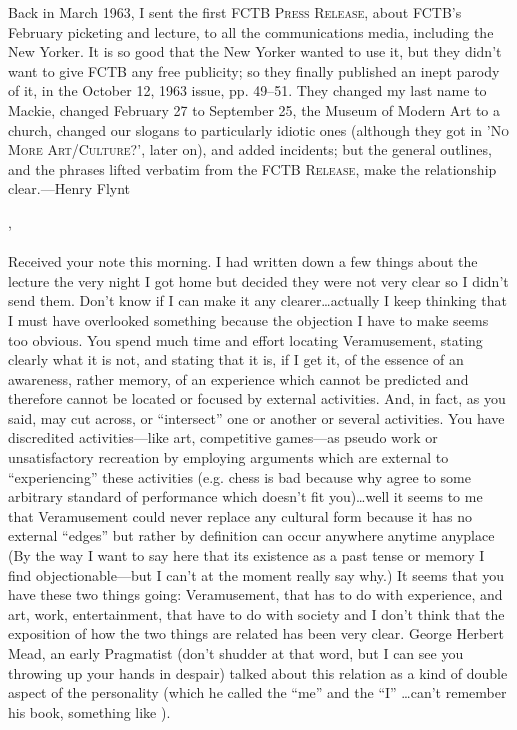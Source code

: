 \vfill


Back in March 1963, I sent the first \textsc{FCTB Press Release}, about FCTB's February picketing and lecture, to all the communications media, including the New Yorker. It is so good that the New Yorker wanted to use it, but they didn't want to give FCTB any free publicity; so they finally published an inept parody of it, in the October 12, 1963 issue, pp. 49--51. They changed my last name to Mackie, changed February 27 to September 25, the Museum of Modern Art to a church, changed our slogans to particularly idiotic ones (although they got in '\textsc{No More Art/Culture?}', later on), and added incidents; but the general outlines, and the phrases lifted verbatim from the \textsc{FCTB Release}, make the relationship clear.---Henry Flynt 

\clearpage



\vfill 

\noindentHenry, \\\\Received your note this morning. I had written down a few things about the lecture the very night I got home but decided they were not very clear so I didn't send them. Don't know if I can make it any clearer\ldots actually I keep thinking that I must have overlooked something because the objection I have to make seems too obvious. You spend much time and effort locating Veramusement, stating clearly what it is not, and stating that it is, if I get it, of the essence of an awareness, rather memory, of an experience which cannot be predicted and therefore cannot be located or focused by external activities. And, in fact, as you said, may cut across, or \enquote{intersect} one or another or several activities. You have discredited activities---like art, competitive games---as pseudo work or unsatisfactory recreation by employing arguments which are external to \enquote{experiencing} these activities (e.g. chess is bad because why agree to some arbitrary standard of performance which doesn't fit you)\ldots well it seems to me that Veramusement could never replace any cultural form because it has no external \enquote{edges} but rather by definition can occur anywhere anytime anyplace (By the way I want to say here that its existence as a past tense or memory I find objectionable---but I can't at the moment really say why.) It seems that you have these two things going: Veramusement, that has to do with experience, and art, work, entertainment, that have to do with society and I don't think that the exposition of how the two things are related has been very clear. George Herbert Mead, an early Pragmatist (don't shudder at that word, but I can see you throwing up your hands in despair) talked about this relation as a kind of double aspect of the personality (which he called the \enquote{me} and the \enquote{I} \ldots can't remember his book, something like ). 

